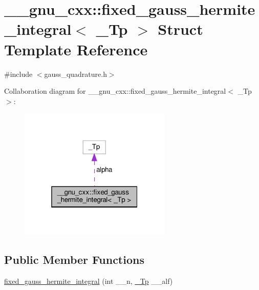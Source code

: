 \hypertarget{struct____gnu__cxx_1_1fixed__gauss__hermite__integral}{}\section{\+\_\+\+\_\+gnu\+\_\+cxx\+:\+:fixed\+\_\+gauss\+\_\+hermite\+\_\+integral$<$ \+\_\+\+Tp $>$ Struct Template Reference}
\label{struct____gnu__cxx_1_1fixed__gauss__hermite__integral}


{\ttfamily \#include $<$gauss\+\_\+quadrature.\+h$>$}



Collaboration diagram for \+\_\+\+\_\+gnu\+\_\+cxx\+:\+:fixed\+\_\+gauss\+\_\+hermite\+\_\+integral$<$ \+\_\+\+Tp $>$\+:
\nopagebreak
\begin{figure}[H]
\begin{center}
\leavevmode
\includegraphics[width=205pt]{struct____gnu__cxx_1_1fixed__gauss__hermite__integral__coll__graph}
\end{center}
\end{figure}
\subsection*{Public Member Functions}
\begin{DoxyCompactItemize}
\item 
\hyperlink{struct____gnu__cxx_1_1fixed__gauss__hermite__integral_afb6f594f7724e05c648326005e4302a7}{fixed\+\_\+gauss\+\_\+hermite\+\_\+integral} (int \+\_\+\+\_\+n, \hyperlink{namespace____gnu__cxx_a3b19a9c800ca194374ef9172290f7d79}{\+\_\+\+Tp} \+\_\+\+\_\+alf)
\end{DoxyCompactItemize}
